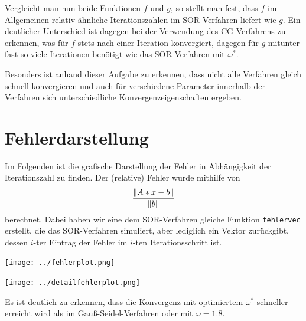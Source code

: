 \documentclass[ %
ngerman, %
a4paper, %
sectionreset, %
chapterstyle=framed, %
sectionstyle=dotted, %
titlefont=osfamily %
]{../../../../texmf/tex/latex/mathscriptMathTUD/mathscriptMathTUD}
\begin{document}
	Vergleicht man nun beide Funktionen $f$ und $g$, so stellt man fest, dass $f$ im Allgemeinen relativ ähnliche Iterationszahlen im SOR-Verfahren liefert wie $g$. Ein deutlicher Unterschied ist dagegen bei der Verwendung des CG-Verfahrens zu erkennen, was für $f$ stets nach einer Iteration konvergiert, dagegen für $g$ mitunter fast so viele Iterationen benötigt wie das SOR-Verfahren mit $\omega^\ast$.
	
	Besonders ist anhand dieser Aufgabe zu erkennen, dass nicht alle Verfahren gleich schnell konvergieren und auch für verschiedene Parameter innerhalb der Verfahren sich unterschiedliche Konvergenzeigenschaften ergeben.
	
	\section{Fehlerdarstellung}
	\newlength{\halfpage}
	\setlength{\halfpage}{\dimexpr0.5\linewidth-\fboxrule-\fboxsep}
	
	Im Folgenden ist die grafische Darstellung der Fehler in Abhängigkeit der Iterationszahl zu finden. Der (relative) Fehler wurde mithilfe von
	\begin{equation*}
		\frac{\left\lVert A*x - b \right\rVert}{\left\lVert b \right\rVert}
	\end{equation*}
	berechnet. Dabei haben wir eine dem SOR-Verfahren gleiche Funktion \texttt{fehlervec} erstellt, die das SOR-Verfahren simuliert, aber lediglich ein Vektor zurückgibt, dessen $i$-ter Eintrag der Fehler im $i$-ten Iterationsschritt ist. 
	
	\begin{minipage}{\dimexpr0.5\linewidth-\fboxrule-\fboxsep}
		\centering
		\texttt{[image: ../fehlerplot.png]}
	\end{minipage}
	\begin{minipage}{\dimexpr0.5\linewidth-\fboxrule-\fboxsep}
		\centering
		\texttt{[image: ../detailfehlerplot.png]}
	\end{minipage}

	Es ist deutlich zu erkennen, dass die Konvergenz mit optimiertem $\omega^\ast$ schneller erreicht wird als im Gauß-Seidel-Verfahren oder mit $\omega = 1.8$.
\end{document}
